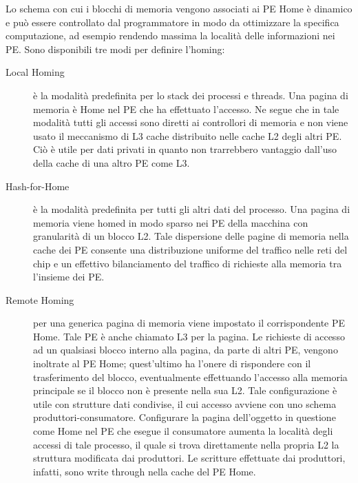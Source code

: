 Lo schema con cui i blocchi di memoria vengono associati ai PE Home \`e dinamico e pu\`o essere controllato dal programmatore in modo da ottimizzare la specifica computazione, ad esempio rendendo massima la localit\`a delle informazioni nei PE. Sono disponibili tre modi per definire l'homing:
\begin{description}
\item [Local Homing] \`e la modalit\`a predefinita per lo stack dei processi e threads. Una pagina di memoria \`e Home nel PE che ha effettuato l'accesso. Ne segue che in tale modalit\`a tutti gli accessi sono diretti ai controllori di memoria e non viene usato il meccanismo di L3 cache distribuito nelle cache L2 degli altri PE. Ci\`o \`e utile per dati privati in quanto non trarrebbero vantaggio dall'uso della cache di una altro PE come L3.
\item [Hash-for-Home] \`e la modalit\`a predefinita per tutti gli altri dati del processo. Una pagina di memoria viene homed in modo sparso nei PE della macchina con granularit\`a di un blocco L2. Tale dispersione delle pagine di memoria nella cache dei PE consente una distribuzione uniforme del traffico nelle reti del chip e un effettivo bilanciamento del traffico di richieste alla memoria tra l'insieme dei PE.
\item [Remote Homing] per una generica pagina di memoria viene impostato il corrispondente PE Home. Tale PE \`e anche chiamato L3 per la pagina. Le richieste di accesso ad un qualsiasi blocco interno alla pagina, da parte di altri PE, vengono inoltrate al PE Home; quest'ultimo ha l'onere di rispondere con il trasferimento del blocco, eventualmente effettuando l'accesso alla memoria principale se il blocco non \`e presente nella sua L2. Tale configurazione \`e utile con strutture dati condivise, il cui accesso avviene con uno schema produttori-consumatore. Configurare la pagina dell'oggetto in questione come Home nel PE che esegue il consumatore aumenta la localit\`a degli accessi di tale processo, il quale si trova direttamente nella propria L2 la struttura modificata dai produttori. Le scritture effettuate dai produttori, infatti, sono write through nella cache del PE Home.
\end{description}
